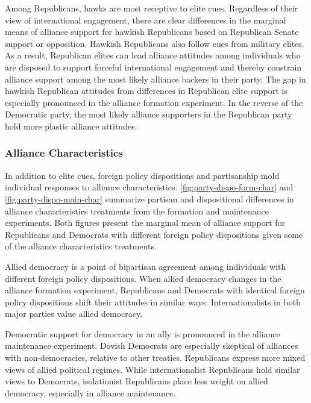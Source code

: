\documentclass[12pt]{article}
\begin{document}
Among Republicans, hawks are most receptive to elite cues. 
Regardless of their view of international engagement, there are clear differences in the marginal means of alliance support for hawkish Republicans based on Republican Senate support or opposition.
Hawkish Republicans also follow cues from military elites. 
As a result, Republican elites can lead alliance attitudes among individuals who are disposed to support forceful international engagement and thereby constrain alliance support among the most likely alliance backers in their party. 
The gap in hawkish Republican attitudes from differences in Republican elite support is especially pronounced in the alliance formation experiment. 
In the reverse of the Democratic party, the most likely alliance supporters in the Republican party hold more plastic alliance attitudes. 



\subsubsection{Alliance Characteristics}



In addition to elite cues, foreign policy dispositions and partisanship mold individual responses to alliance characteristics. 
\autoref{fig:party-dispo-form-char} and \autoref{fig:party-dispo-main-char} summarize partisan and dispositional differences in alliance characteristics treatments from the formation and maintenance experiments. 
Both figures present the marginal mean of alliance support for Republicans and Democrats with different foreign policy dispositions given some of the alliance characteristics treatments. 


Allied democracy is a point of bipartisan agreement among individuals with different foreign policy dispositions.
When allied democracy changes in the alliance formation experiment, Republicans and Democrats with identical foreign policy dispositions shift their attitudes in similar ways. 
Internationalists in both major parties value allied democracy. 


Democratic support for democracy in an ally is pronounced in the alliance maintenance experiment. 
Dovish Democrats are especially skeptical of alliances with non-democracies, relative to other treaties. 
Republicans express more mixed views of allied political regimes. 
While internationalist Republicans hold similar views to Democrats, isolationist Republicans place less weight on allied democracy, especially in alliance maintenance. 
\end{document}
